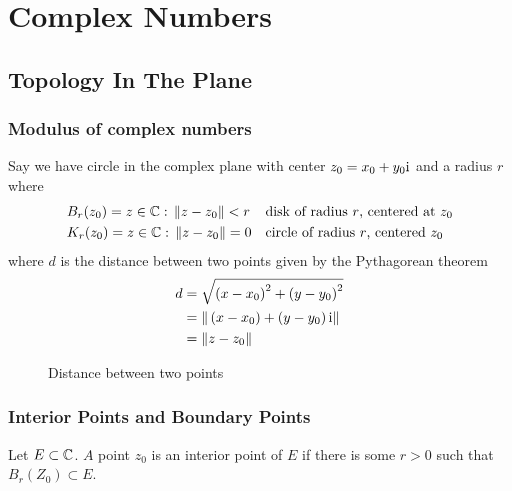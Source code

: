 \documentclass{caesar_book}
\begin{document}
\frontmatter
\mainmatter
\chapter{Complex Numbers}

\section{Topology In The Plane}
\subsection{Modulus of complex numbers}
Say we have circle in the complex plane with center $z_0 = x_0 +y_0 \rm{i}$ and a radius $r$ where 
    \begin{align*}
        &B_r(z_0) = {z \in {\mathbb{C}}: \, \|z-z_0\| < r} &&
            \text{disk of radius $r$, centered at $z_0$}\\
        &K_r(z_0) = {z \in {\mathbb{C}}: \, \|z-z_0\| = 0} &&
            \text{circle of radius $r$, centered  $z_0$}
    \end{align*}
where $d$ is the distance between two points given by the Pythagorean theorem
    \begin{align*}
     d &= \sqrt{\left( x-x_0 \right)^2+\left( y-y_0 \right)^2 }\\
       &= \|\left( x-x_0 \right) + \left( y - y_0 \right)\rm{i} \|\\
       &= \|z-z_0\|
    \end{align*}

\begin{figure}[ht]
    \centering
    \caption{Distance between two points}
    \label{fig:distance}
\end{figure}

\subsection{Interior Points and Boundary Points}
\begin{definition}
    Let $E \subset {\mathbb{C}}$.  $A$ point  $z_0$ is an interior point of  $E$ if there
    is some  $r > 0$ such that  $B_r(Z_0) \subset E$.
\end{definition}
\end{document}

